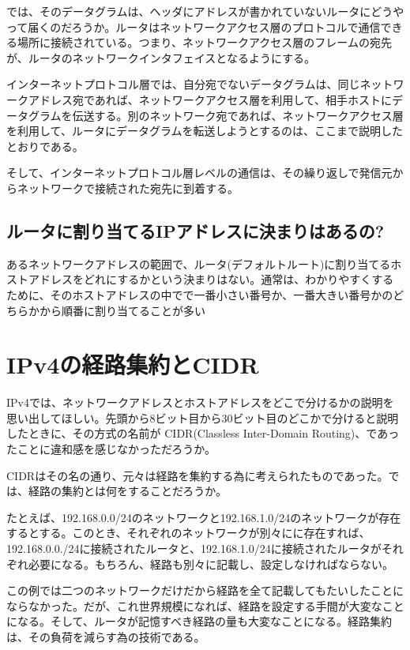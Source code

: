 では、そのデータグラムは、ヘッダにアドレスが書かれていないルータにどうやって届くのだろうか。ルータはネットワークアクセス層のプロトコルで通信できる場所に接続されている。つまり、ネットワークアクセス層のフレームの宛先が、ルータのネットワークインタフェイスとなるようにする。

インターネットプロトコル層では、自分宛でないデータグラムは、同じネットワークアドレス宛であれば、ネットワークアクセス層を利用して、相手ホストにデータグラムを伝送する。別のネットワーク宛であれば、ネットワークアクセス層を利用して、ルータにデータグラムを転送しようとするのは、ここまで説明したとおりである。

そして、インターネットプロトコル層レベルの通信は、その繰り返しで発信元からネットワークで接続された宛先に到着する。


\subsection{ルータに割り当てるIPアドレスに決まりはあるの?}
あるネットワークアドレスの範囲で、ルータ(デフォルトルート)に割り当てるホストアドレスをどれにするかという決まりはない。通常は、わかりやすくするために、そのホストアドレスの中でで一番小さい番号か、一番大きい番号かのどちらかから順番に割り当てることが多い

\section{IPv4の経路集約とCIDR}

IPv4では、ネットワークアドレスとホストアドレスをどこで分けるかの説明を思い出してほしい。先頭から8ビット目から30ビット目のどこかで分けると説明したときに、その方式の名前が CIDR(Classless Inter-Domain Routing)、であったことに違和感を感じなかっただろうか。

CIDRはその名の通り、元々は経路を集約する為に考えられたものであった。では、経路の集約とは何をすることだろうか。

たとえば、192.168.0.0/24のネットワークと192.168.1.0/24のネットワークが存在するとする。このとき、それぞれのネットワークが別々にに存在すれば、192.168.0.0./24に接続されたルータと、192.168.1.0/24に接続されたルータがそれぞれ必要になる。もちろん、経路も別々に記載し、設定しなければならない。

この例では二つのネットワークだけだから経路を全て記載してもたいしたことにならなかった。だが、これ世界規模になれば、経路を設定する手間が大変なことになる。そして、ルータが記憶すべき経路の量も大変なことになる。経路集約は、その負荷を減らす為の技術である。

